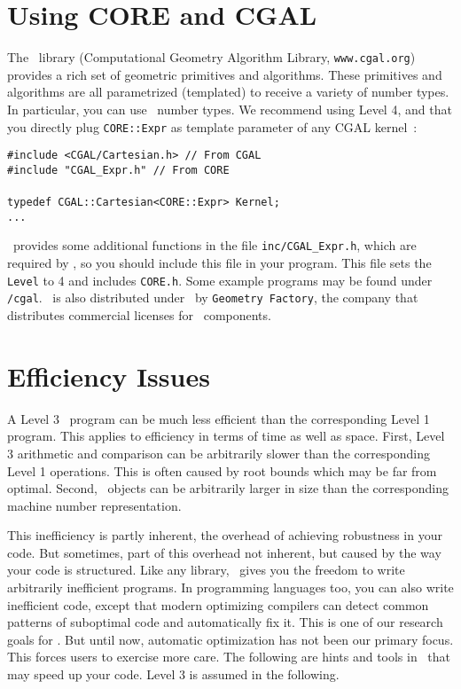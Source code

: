 \documentclass[12pt]{article}
\begin{document}
\section{Using CORE and CGAL}
  \label{using-with-cgal}

The \cgal\ library (Computational Geometry Algorithm Library, 
\texttt{www.cgal.org}) provides a rich set of geometric primitives
and algorithms.  
These primitives and algorithms are all parametrized
(templated) to receive a variety of number types.  In particular,
you can use \core\ number types.  
We recommend using Level 4, and that you
directly plug \texttt{CORE::Expr} as template parameter of any CGAL kernel~:

\begin{progb} {
\> \tt \#include <CGAL/Cartesian.h> // From CGAL\\
\> \tt \#include "CGAL\_Expr.h"      // From CORE\\
\> \\
\> \tt typedef CGAL::Cartesian<CORE::Expr>  Kernel;\\
\> \tt ...
}\end{progb}

\noindent
\core\ provides some additional functions in the 
file \texttt{inc/CGAL\_Expr.h}, which
are required by \cgal, so you should include this file in your program.
This file sets the {\tt Level} to 4 and 
includes \texttt{CORE.h}.  Some example programs may
be found under \examplesdir\texttt{/cgal}.
\corelib\ is also distributed under \cgal\ by {\tt Geometry Factory},
the company that distributes commercial licenses for \cgal\ components.

\section{Efficiency Issues}

A Level 3 \core\ program can be much less efficient than the
corresponding Level 1 program.  This applies to efficiency
in terms of time as well as space.  First,
Level 3 arithmetic and comparison can be arbitrarily 
slower than the corresponding Level 1 operations.
This is often caused by root bounds which may be far from optimal.
Second,
\expr\ objects can be arbitrarily larger in size than
the corresponding machine number representation.

This inefficiency is partly inherent,
the overhead of achieving robustness in your code.  
But sometimes, part of this overhead not inherent, but caused
by the way your code is structured.
Like any library, \corelib\ gives you the freedom to 
write arbitrarily inefficient programs.
In programming languages too, you can also write inefficient code,
except that modern optimizing compilers can detect
common patterns of suboptimal code and automatically fix it.
This is one of our research goals for \corelib. 
But until now, automatic optimization has not been our primary focus.
This forces users to exercise more care.
The following are hints and tools in \corelib\ that
may speed up your code.  Level 3 is assumed in the following.
\end{document}
